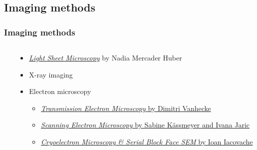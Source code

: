 \begin{frame}
\begin{columns}
\begin{column}{0.38\textwidth}
{%
      }%
    \end{column}%
  \end{columns}%
\end{frame}

\subsection{Imaging methods}
\begin{frame}
  \frametitle{Imaging methods}
  \begin{columns}
    \begin{column}{0.5\textwidth}
    \end{column}
    \begin{column}{0.5\textwidth}
      \begin{itemize}
        \item \href{https://ilias.unibe.ch/goto_ilias3_unibe_sess_3022933.html}{\emph{Light Sheet Microscopy}} by Nadia Mercader Huber
        \item X-ray imaging
        \item Electron microscopy
          \begin{itemize}
            \item \href{https://ilias.unibe.ch/goto_ilias3_unibe_sess_3022941.html}{\emph{Transmission Electron Microscopy} by Dimitri Vanhecke}
            \item \href{https://ilias.unibe.ch/goto_ilias3_unibe_sess_3022943.html}{\emph{Scanning Electron Microscopy} by Sabine Kässmeyer and Ivana Jaric}
            \item \href{https://ilias.unibe.ch/goto_ilias3_unibe_sess_3022945.html}{\emph{Cryoelectron Microscopy \& Serial Block Face SEM} by Ioan Iacovache}
          \end{itemize}
      \end{itemize}
    \end{column}
  \end{columns}
\end{frame}

